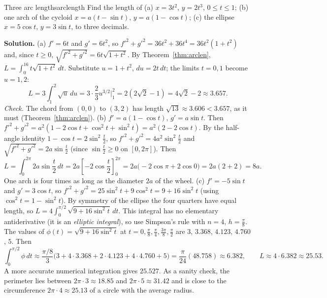 \documentclass[11pt]{article}
\begin{document}
\begin{exmp}{Three arc lengths}{arclength}
Find the length of (a) $x=3t^2$, $y=2t^3$, $0\le t\le1$; (b) one arch of the cycloid $x=a(t-\sin t)$, $y=a(1-\cos t)$; (c) the ellipse $x=5\cos t$, $y=3\sin t$, to three decimals.

\textbf{Solution.} (a) $f'=6t$ and $g'=6t^2$, so $f'^2+g'^2=36t^2+36t^4=36t^2(1+t^2)$ and, since $t\ge0$, $\sqrt{f'^2+g'^2}=6t\sqrt{1+t^2}$. By Theorem~\ref{thm:arclen}, $L=\int_0^16t\sqrt{1+t^2}\,dt$. Substitute $u=1+t^2$, $du=2t\,dt$; the limits $t=0,1$ become $u=1,2$:
\[
L=3\int_1^2\sqrt u\,du=3\cdot\frac23u^{3/2}\Big|_1^2=2\left(2\sqrt2-1\right)=4\sqrt2-2\approx3.657.
\]
\emph{Check.} The chord from $(0,0)$ to $(3,2)$ has length $\sqrt{13}\approx3.606<3.657$, as it must (Theorem~\ref{thm:arclen}).
(b) $f'=a(1-\cos t)$, $g'=a\sin t$. Then $f'^2+g'^2=a^2\left(1-2\cos t+\cos^2t+\sin^2t\right)=a^2(2-2\cos t)$. By the half-angle identity $1-\cos t=2\sin^2\frac t2$, so $f'^2+g'^2=4a^2\sin^2\frac t2$ and $\sqrt{f'^2+g'^2}=2a\sin\frac t2$ (since $\sin\frac t2\ge0$ on $[0,2\pi]$). Then
\[
L=\int_0^{2\pi}2a\sin\frac t2\,dt=2a\left[-2\cos\frac t2\right]_0^{2\pi}=2a\bigl(-2\cos\pi+2\cos0\bigr)=2a(2+2)=8a.
\]
One arch is four times as long as the diameter $2a$ of the wheel.
(c) $f'=-5\sin t$ and $g'=3\cos t$, so $f'^2+g'^2=25\sin^2t+9\cos^2t=9+16\sin^2t$ (using $\cos^2t=1-\sin^2t$). By symmetry of the ellipse the four quarters have equal length, so $L=4\int_0^{\pi/2}\sqrt{9+16\sin^2t}\,dt$. This integral has no elementary antiderivative (it is an \emph{elliptic integral}), so use Simpson's rule with $n=4$, $h=\frac\pi8$. The values of $\phi(t)=\sqrt{9+16\sin^2t}$ at $t=0,\frac\pi8,\frac\pi4,\frac{3\pi}8,\frac\pi2$ are $3$, $3.368$, $4.123$, $4.760$, $5$. Then
\[
\int_0^{\pi/2}\phi\,dt\approx\frac{\pi/8}3\bigl(3+4\cdot3.368+2\cdot4.123+4\cdot4.760+5\bigr)=\frac\pi{24}(48.758)\approx6.382,\qquad L\approx4\cdot6.382\approx25.53.
\]
A more accurate numerical integration gives $25.527$. As a sanity check, the perimeter lies between $2\pi\cdot3\approx18.85$ and $2\pi\cdot5\approx31.42$ and is close to the circumference $2\pi\cdot4\approx25.13$ of a circle with the average radius.
\end{exmp}
\end{document}
